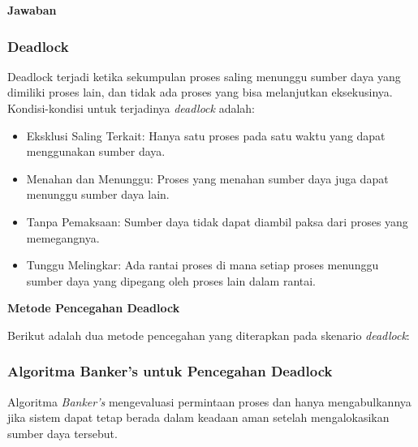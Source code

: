 \documentclass[12pt]{article}
\begin{document}
\textbf{Jawaban}
\subsubsection{Deadlock}
Deadlock terjadi ketika sekumpulan proses saling menunggu sumber daya yang dimiliki proses lain, dan tidak ada proses yang bisa melanjutkan eksekusinya. Kondisi-kondisi untuk terjadinya \textit{deadlock} adalah:
\begin{itemize}
    \item Eksklusi Saling Terkait: Hanya satu proses pada satu waktu yang dapat menggunakan sumber daya.
    \item Menahan dan Menunggu: Proses yang menahan sumber daya juga dapat menunggu sumber daya lain.
    \item Tanpa Pemaksaan: Sumber daya tidak dapat diambil paksa dari proses yang memegangnya.
    \item Tunggu Melingkar: Ada rantai proses di mana setiap proses menunggu sumber daya yang dipegang oleh proses lain dalam rantai.
\end{itemize}

\textbf{Metode Pencegahan Deadlock}

Berikut adalah dua metode pencegahan yang diterapkan pada skenario \textit{deadlock}:

\subsubsection{Algoritma Banker's untuk Pencegahan Deadlock}
Algoritma \textit{Banker's} mengevaluasi permintaan proses dan hanya mengabulkannya jika sistem dapat tetap berada dalam keadaan aman setelah mengalokasikan sumber daya tersebut.
\end{document}

